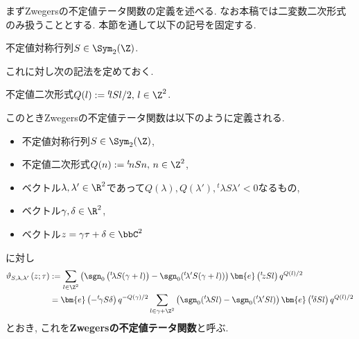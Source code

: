 \documentclass[11pt,b5paper,oneside,lualatex]{ltjsarticle} %
\numberwithin{equation}{section} %
\begin{document}


まずZwegersの不定値テータ関数の定義を述べる. 
なお本稿では二変数二次形式のみ扱うこととする. 
本節を通して以下の記号を固定する. 

\begin{symb}
	不定値対称行列$ S \in \Sym_2(\Z) $.
\end{symb}

これに対し次の記法を定めておく. 

\begin{dfn}
	不定値二次形式$ Q(l) := {}^t\!l S l /2, \, l \in \Z^2 $.
\end{dfn}

このときZwegersの不定値テータ関数は以下のように定義される. 

\begin{dfn}
	\label{dfn:Zwegers_theta}
	\leavevmode %
	\begin{itemize}
		\item 不定値対称行列$ S \in \Sym_2(\Z) $,
		\item 不定値二次形式$ Q(n) := {}^t\!n S n, \, n \in \Z^2 $,
		\item ベクトル$ \lambda, \lambda' \in \R^2 $であって$ Q(\lambda), Q(\lambda'), {}^t\!\lambda S \lambda' < 0 $なるもの,
		\item ベクトル$ \gamma, \delta \in \R^2 $,
		\item ベクトル$ z = \gamma \tau + \delta \in \bbC^2 $
	\end{itemize}
	に対し
	\begin{align}
		\vartheta_{S, \lambda, \lambda'} \left( z; \tau \right)
		&:=
		\sum_{l \in \Z^2}
		\left(\sgn_0 \left( {}^t\!\lambda S (\gamma + l) \right) - \sgn_0( {}^t\!\lambda' S (\gamma + l) ) \right)
		\bm{e} \left( {}^t\!z S l \right) q^{Q(l)/2}
		\\
		&=
		\bm{e} \left( -{}^t\!\gamma S \delta \right) q^{-Q(\gamma)/2}		
		\sum_{l \in \gamma + \Z^2}
		\left(\sgn_0( {}^t\!\lambda S l ) - \sgn_0( {}^t\!\lambda' S l ) \right)
		\bm{e} \left( {}^t\!\delta S l \right) q^{Q(l)/2}
	\end{align}
	とおき, これを\textbf{Zwegersの不定値テータ関数}と呼ぶ. 
\end{dfn}
\end{document}
